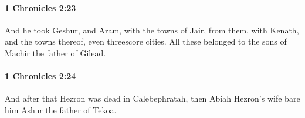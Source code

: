 		\paragraph{1 Chronicles 2:23} %
			\label{1CHRONICLES-2-23}

			And he took Geshur, and Aram, with the towns of Jair, from them, with Kenath, and the towns thereof, even threescore cities. All these belonged to the sons of Machir the father of Gilead.


		\paragraph{1 Chronicles 2:24} %
			\label{1CHRONICLES-2-24}

			And after that Hezron was dead in Calebephratah, then Abiah Hezron’s wife bare him Ashur the father of Tekoa.


